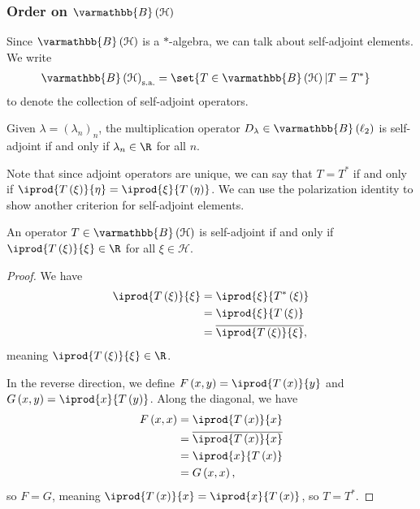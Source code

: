 \documentclass[10pt]{mypackage}
\renewcommand*{\mathbb}[1]{\varmathbb{#1}}
\newcommand{\sa}{\text{s.a.}}
\newcommand{\B}{\mathbb{B}}
\begin{document}
\subsubsection{Order on $\B\left(\mathcal{H}\right)$}%
Since $\B\left(\mathcal{H}\right)$ is a $\ast$-algebra, we can talk about self-adjoint elements. We write
\begin{align*}
  \B\left(\mathcal{H}\right)_{\sa} &= \set{T\in \B\left(\mathcal{H}\right)|T = T^{\ast}}
\end{align*}
to denote the collection of self-adjoint operators.
\begin{example}
  Given $\lambda = \left(\lambda_n\right)_n$, the multiplication operator $D_{\lambda}\in \B\left(\ell_2\right)$ is self-adjoint if and only if $\lambda_n\in \R$ for all $n$.
\end{example}
Note that since adjoint operators are unique, we can say that $T = T^{\ast}$ if and only if $ \iprod{T\left(\xi\right)}{\eta} = \iprod{\xi}{T\left(\eta\right)} $. We can use the polarization identity to show another criterion for self-adjoint elements.
\begin{lemma}
  An operator $T\in \B\left(\mathcal{H}\right)$ is self-adjoint if and only if $ \iprod{T\left(\xi\right)}{\xi}\in \R $ for all $\xi\in \mathcal{H}$.
\end{lemma}
\begin{proof}
  We have
  \begin{align*}
    \iprod{T\left(\xi\right)}{\xi} &= \iprod{\xi}{T^{\ast}\left(\xi\right)}\\
                                   &= \iprod{\xi}{T\left(\xi\right)}\\
                                   &= \overline{ \iprod{T\left(\xi\right)}{\xi} },
  \end{align*}
  meaning $ \iprod{T\left(\xi\right)}{\xi}\in \R $.\newline

  In the reverse direction, we define $F\left(x,y\right) = \iprod{T\left(x\right)}{y}$ and $ G\left(x,y\right) = \iprod{x}{T\left(y\right)} $. Along the diagonal, we have
  \begin{align*}
    F\left(x,x\right) &= \iprod{T\left(x\right)}{x}\\
                      &= \overline{ \iprod{T\left(x\right)}{x} }\\
                      &= \iprod{x}{T\left(x\right)}\\
                      &= G\left(x,x\right),
  \end{align*}
  so $F = G$, meaning $ \iprod{T\left(x\right)}{x} = \iprod{x}{T\left(x\right)} $, so $T = T^{\ast}$.
\end{proof}
\end{document}
